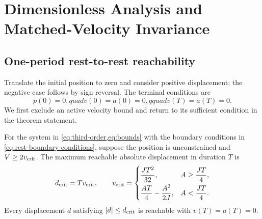 \section{Dimensionless Analysis and Matched-Velocity Invariance}
\label{sec:analysis}

\subsection{One-period rest-to-rest reachability}

Translate the initial position to zero and consider positive displacement; the negative case follows by sign reversal. The terminal conditions are
\begin{equation}
 p(0)=0,quad v(0)=a(0)=0,qquad v(T)=a(T)=0.
 \label{eq:rest-boundary-conditions}
\end{equation}
We first exclude an active velocity bound and return to its sufficient condition in the theorem statement.

\begin{theorem}
\label{thm:rest-boundary}
For the system in \cref{eq:third-order,eq:bounds} with the boundary conditions in \cref{eq:rest-boundary-conditions}, suppose the position is unconstrained and $V\ge2v_{\mathrm{crit}}$. The maximum reachable absolute displacement in duration $T$ is
\begin{equation}
 d_{\mathrm{crit}}=Tv_{\mathrm{crit}},
 \qquad
 v_{\mathrm{crit}}=
 \begin{cases}
 \displaystyle \frac{JT^2}{32}, & A\ge \dfrac{JT}{4},\\[6pt]
 \displaystyle \frac{AT}{4}-\frac{A^2}{2J}, & A<\dfrac{JT}{4}.
 \end{cases}
 \label{eq:vcrit}
\end{equation}
Every displacement $d$ satisfying $\lvert d\rvert\le d_{\mathrm{crit}}$ is reachable with $v(T)=a(T)=0$.
\end{theorem}

